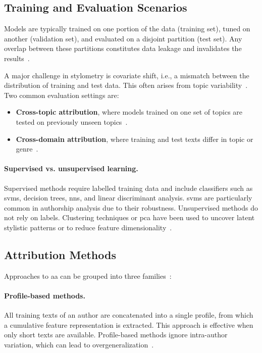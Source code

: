 \subsection{Training and Evaluation Scenarios}

Models are typically trained on one portion of the data (training set), tuned on another (validation set), and evaluated on a disjoint partition (test set). 
Any overlap between these partitions constitutes data leakage and invalidates the results~\citep{bischoff_importance_2020,altakrori_topic_2021,boenninghoff_o2d2_2021}. 

A major challenge in stylometry is covariate shift, i.e., a mismatch between the distribution of training and test data. 
This often arises from topic variability~\citep{boenninghoff_o2d2_2021}. 
Two common evaluation settings are:
\begin{itemize}
    \item \textbf{Cross-topic attribution}, where models trained on one set of topics are tested on previously unseen topics~\citep{altakrori_topic_2021}.  
    \item \textbf{Cross-domain attribution}, where training and test texts differ in topic or genre~\citep{barlas_cross_domain_2020}.  
\end{itemize}

\paragraph{Supervised vs. unsupervised learning.}  
Supervised methods require labelled training data and include classifiers such as \acp{svm}, decision trees, \acp{nn}, and linear discriminant analysis. 
\acp{svm} are particularly common in authorship analysis due to their robustness. 
Unsupervised methods do not rely on labels.
Clustering techniques or \ac{pca} have been used to uncover latent stylistic patterns or to reduce feature dimensionality~\citep{abbasi_writeprints_2008}.


\subsection{Attribution Methods}
\label{subsec:attribution_methods}

Approaches to \ac{aa} can be grouped into three families~\citep{stamatatos_survey_2009}:

\paragraph{Profile-based methods.} 
All training texts of an author are concatenated into a single profile, from which a cumulative feature representation is extracted. 
This approach is effective when only short texts are available.
Profile-based methods ignore intra-author variation, which can lead to overgeneralization~\citep{stamatatos_survey_2009,elmanarelbouanani_authorship_2014,neal_surveying_2018}.  

